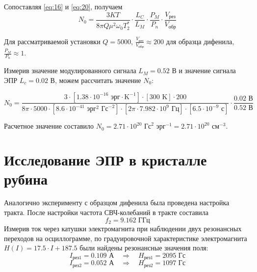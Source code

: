 \documentclass[a4paper,14pt]{extarticle}
\begin{document}
Сопоставляя \eqref{eq:16} и \eqref{eq:20}, получаем
\begin{equation}
    \label{eq:21}
    N_0 = \frac{3KT}{8\pi Q \mu^2 \omega_{0} T_2^*} \cdot \frac{L_C}{L_M}  \cdot \frac{P_M}{P_n} \cdot \frac{V_{\text{рез}}}{V_{\text{обр}}}
\end{equation}

Для рассматриваемой установки $Q=5000$, $\frac{V_\text{рез}}{V_\text{обр}} \approx 200$ для образца дифенила, $ \frac{P_M}{P_n}\approx1$.

Измерив значение модулированного сигнала $L_M=0.52$ В и значение сигнала ЭПР $L_c=0.02$ В, можем рассчитать значение $N_0$:

\begin{equation}
  N_0 = \frac{3\cdot [1.38\cdot10^{-16} \text{ эрг}\cdot\text{K}^{-1}]\cdot [300 \text{ K}]\cdot 200}{8\pi \cdot 5000 \cdot [8.6\cdot 10^{-41} \text{ эрг}^2\text{ Гс}^{-2}]\cdot [2\pi\cdot 7.982\cdot 10^9 \text{ Гц} ]\cdot [6.5 \cdot 10^{-9} \text{ с}]}\cdot \frac{0.02 \text{ В}}{0.52 \text{ В}}
\end{equation}

Расчетное значение составило $N_0=2.71\cdot 10^{20} \text{ Гс}^2 \text{ эрг}^{-1}=2.71\cdot 10^{20} \text{ см}^{-3}$.


\section{Исследование ЭПР в кристалле рубина}

Аналогично эксперименту с образцом дифенила была проведена настройка тракта. После настройки частота СВЧ-колебаний в тракте составила
\begin{equation}
  f_2=9.162 \text{ ГГц}
\end{equation}
Измерив ток через катушки электромагнита при наблюдении двух резонансных переходов на осциллограмме, по градуировочной характеристике электромагнита $H(I)=17.5\cdot I+ 187.5$ были найдены резонансные значения поля:
\begin{equation}
  I_\text{рез1}=0.109 \text{ А}  \quad\Rightarrow\quad
  H_\text{рез1}=2095 \text{ Гс}
\end{equation}
\begin{equation}
  I_\text{рез2}=0.052 \text{ А}  \quad\Rightarrow\quad
  H_\text{рез2}=1097 \text{ Гс}
\end{equation}

\end{document}
